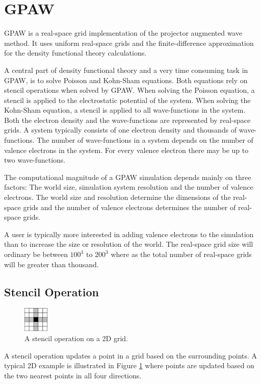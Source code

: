\documentclass[preprint,3p,times,twocolumn]{elsarticle}
\begin{document}
\section{GPAW}
GPAW is a real-space grid implementation of the projector augmented wave method\cite{paw}. It uses uniform real-space grids and the finite-difference approximation for the density functional theory calculations.

A central part of density functional theory and a very time consuming task in GPAW, is to solve Poisson and Kohn-Sham equations. Both equations rely on stencil operations when solved by GPAW. When solving the Poisson equation, a stencil is applied to the electrostatic potential of the system. When solving the Kohn-Sham equation, a stencil is applied to all wave-functions in the system. Both the electron density and the wave-functions are represented by real-space grids. A system typically consists of one electron density and thousands of wave-functions. The number of wave-functions in a system depends on the number of valence electrons in the system. For every valence electron there may be up to two wave-functions.

The computational magnitude of a GPAW simulation depends mainly on three factors: The world size, simulation system resolution and the number of valence electrons. The world size and resolution determine the dimensions of the real-space grids and the number of valence electrons determines the number of real-space grids.

A user is typically more interested in adding valence electrons to the simulation than to increase the size or resolution of the world. The real-space grid size will ordinary be between $100^3$ to $200^3$ where as the total number of real-space grids will be greater than thousand.

\subsection{Stencil Operation}
\begin{figure}
 \centering
 \includegraphics[width=45px]{gfx/stencil}
 \caption{A stencil operation on a 2D grid.}
 \label{fig:stencil}
\end{figure}
A stencil operation updates a point in a grid based on the surrounding points. A typical 2D example is illustrated in Figure \ref{fig:stencil} where points are updated based on the two nearest points in all four directions.
\end{document}
